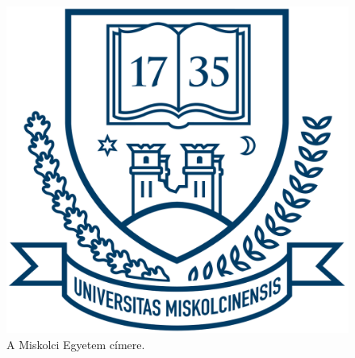 \begin{figure}[h]
\centering
\includegraphics[scale=0.3]{images/me_logo.png}
\caption{A Miskolci Egyetem címere.}
\label{fig:cimer}
\end{figure}
